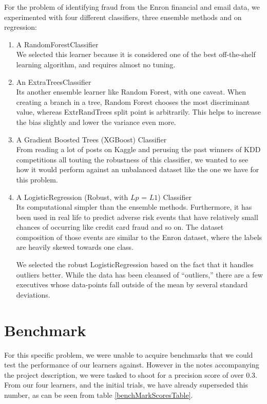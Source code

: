 \documentclass[twoside,openright,titlepage,numbers=noenddot,headinclude,%
               footinclude=true,cleardoublepage=empty,abstractoff,BCOR=5mm,%
               paper=a4,fontsize=11pt,ngerman,american]{scrreprt}
\numberwithin{theorem}{chapter}
\numberwithin{definition}{chapter}
\numberwithin{algorithm}{chapter}
\numberwithin{figure}{chapter}
\numberwithin{table}{chapter}
\numberwithin{equation}{chapter}
\begin{document}
For the problem of identifying fraud from the Enron financial and email data, we experimented with four different classifiers, three ensemble methods and on regression:
\begin{enumerate}%
\item A RandomForestClassifier\\
We selected this learner because it is considered one of the best off-the-shelf learning algorithm, and requires almost no tuning. 
\item An ExtraTreesClassifier\\
 Its another ensemble learner like Random Forest, with one caveat. When creating a branch in a tree, Random Forest chooses the most discriminant value, whereas ExtrRandTrees split point is arbitrarily. This helps to increase the bias slightly and lower the variance even more.
\item A Gradient Boosted Trees (XGBoost) Classifier\\
From reading a lot of posts on Kaggle and perusing the past winners of KDD competitions all touting the robustness of this classifier, we wanted to see how it would perform against an unbalanced dataset like the one we have for this problem.

\item A LogisticRegression (Robust, with $Lp$ = $L1$) Classifier\\
Its computational simpler than the ensemble methods. Furthermore, it has been used in real life to predict adverse risk events that have relatively small chances of occurring like credit card fraud and so on. The dataset composition of those events are similar to the Enron dataset, where the labels are heavily skewed towards one class.

We selected the robust LogisticRegression based on the fact that it handles outliers better. While the data has been cleansed of ``outliers,'' there are a few executives whose data-points fall outside of the mean by several standard deviations.

\end{enumerate}



\section*{Benchmark}

For this specific problem, we were unable to acquire benchmarks that we could test the performance of our learners against. However in the notes accompanying the project description, we were tasked to shoot for a precision score of over 0.3. From our four learners, and the initial trials, we have already superseded this number, as can be seen from table \ref{benchMarkScoresTable}.
\end{document}
